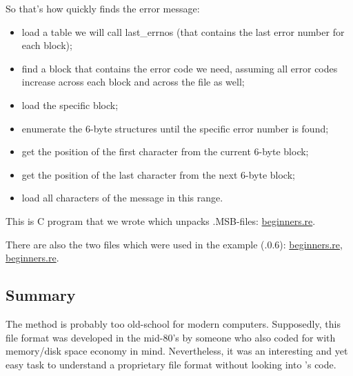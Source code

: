 So that's how \oracle quickly finds the error message:

\begin{itemize}
\item load a table we will call last\_errnos (that contains the last error number for each block);

\item find a block that contains the error code we need, assuming all error codes 
increase across each block and across the file as well;

\item load the specific block;

\item enumerate the 6-byte structures until the specific error number is found;

\item get the position of the first character from the current 6-byte block;

\item get the position of the last character from the next 6-byte block;

\item load all characters of the message in this range.
\end{itemize}

This is C program that we wrote which unpacks .MSB-files:
\href{http://go.yurichev.com/17213}{beginners.re}.

There are also the two files which were used in the example 
(.0.6):
\href{http://go.yurichev.com/17214}{beginners.re},
\href{http://go.yurichev.com/17215}{beginners.re}.

\subsection{Summary}

The method is probably too 
old-school for modern computers.
Supposedly, this file format was developed in the mid-80's by 
someone who also coded for  with
memory/disk space economy in mind.
Nevertheless, it was an interesting and yet easy task 
to understand a proprietary file format without looking into \oracle's code.
